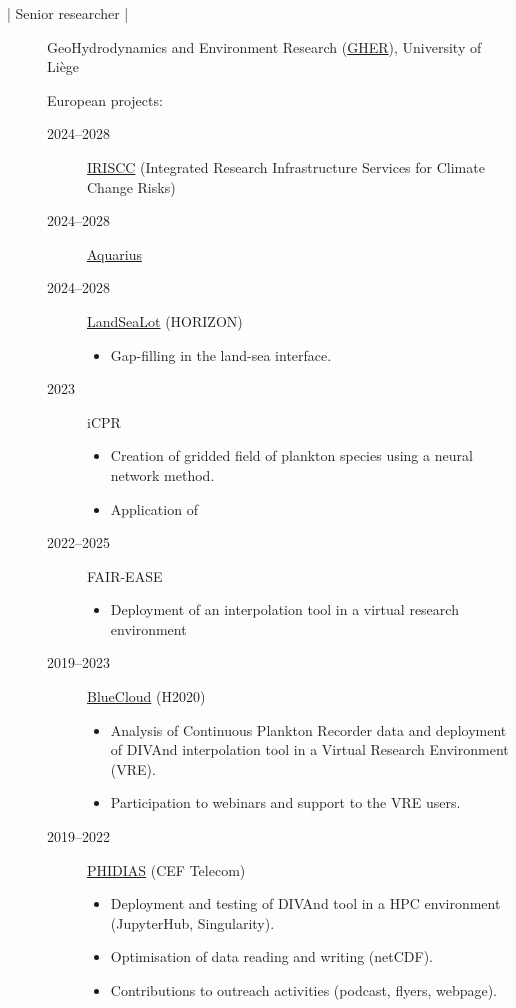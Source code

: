 \documentclass[10pt,a4paper,svgnames]{article}
\begin{document}
\begin{description}
\item[ | Senior researcher |] GeoHydrodynamics and Environment Research (\href{http://modb.oce.ulg.ac.be/}{GHER}), University of Liège

European projects:
\begin{description}

\item[2024--2028] \href{https://www.iriscc.eu/}{IRISCC} (Integrated Research Infrastructure Services for Climate Change Risks)
\item[2024--2028] \href{https://aquarius-ri.eu/}{Aquarius}
\item[2024--2028] \href{https://landsealot.eu/}{LandSeaLot} (HORIZON)
\begin{itemize}
\item Gap-filling in the land-sea interface.
\end{itemize}

\item[2023] iCPR
\begin{itemize}
\item Creation of gridded field of plankton species using a neural network method.
\item Application of 
\end{itemize}

\item[2022--2025] FAIR-EASE
\begin{itemize}
\item Deployment of an interpolation tool in a virtual research environment
\end{itemize}

\item[2019--2023] \href{https://www.blue-cloud.org}{BlueCloud} (H2020)
\begin{itemize}
\item Analysis of Continuous Plankton Recorder data and deployment of \mbox{DIVAnd} interpolation tool in a Virtual Research Environment (VRE).
\item Participation to webinars and support to the VRE users.
\end{itemize}

\item[2019--2022] \href{https://www.phidias-hpc.eu/}{PHIDIAS} (CEF Telecom)
\begin{itemize}
\item Deployment and testing of DIVAnd tool in a HPC environment (JupyterHub, Singularity).
\item Optimisation of data reading and writing (netCDF).
\item Contributions to outreach activities (podcast, flyers, webpage).
\end{itemize}


\end{description}
\end{description}
\end{document}

